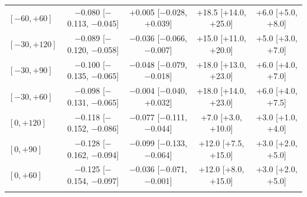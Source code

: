 \begin{table}[tbp]
\begin{tabular*}{\textwidth}{@{\extracolsep\fill}lcccc}
$[{-}60,+60]$ & $-$0.080 [$-$0.113, $-$0.045] & +0.005 [$-$0.028, +0.039] & +18.5 [+14.0, +25.0] & +6.0 [+5.0, +8.0] \\
$[{-}30,+120]$ & $-$0.089 [$-$0.120, $-$0.058] & $-$0.036 [$-$0.066, $-$0.007] & +15.0 [+11.0, +20.0] & +5.0 [+3.0, +7.0] \\
$[{-}30,+90]$ & $-$0.100 [$-$0.135, $-$0.065] & $-$0.048 [$-$0.079, $-$0.018] & +18.0 [+13.0, +23.0] & +6.0 [+4.0, +7.0] \\
$[{-}30,+60]$ & $-$0.098 [$-$0.131, $-$0.065] & $-$0.004 [$-$0.040, +0.032] & +18.0 [+14.0, +23.0] & +6.0 [+4.0, +7.5] \\
$[0,+120]$ & $-$0.118 [$-$0.152, $-$0.086] & $-$0.077 [$-$0.111, $-$0.044] & +7.0 [+3.0, +10.0] & +3.0 [+1.0, +4.0] \\
$[0,+90]$ & $-$0.128 [$-$0.162, $-$0.094] & $-$0.099 [$-$0.133, $-$0.064] & +12.0 [+7.5, +15.0] & +3.0 [+2.0, +5.0] \\
$[0,+60]$ & $-$0.125 [$-$0.154, $-$0.097] & $-$0.036 [$-$0.071, $-$0.001] & +12.0 [+8.0, +15.0] & +3.0 [+2.0, +5.0] \\
\botrule
\end{tabular*}
\end{table}
